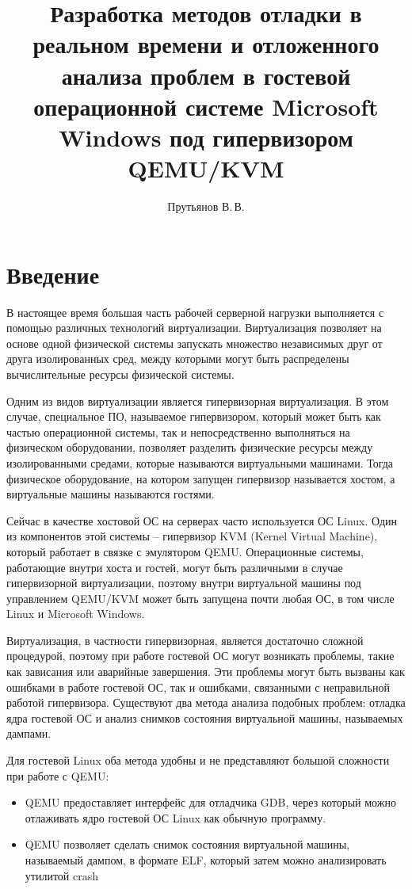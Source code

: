 \documentclass{mipt-thesis-bs}
\title{Разработка методов отладки в реальном времени и отложенного анализа проблем в гостевой операционной системе Microsoft Windows под гипервизором QEMU/KVM}
\author{Прутьянов В.\,В.}
\begin{document}
\titlecontents

\chapter{Введение}

В настоящее время большая часть рабочей серверной нагрузки выполняется с помощью различных технологий виртуализации. Виртуализация позволяет на основе одной физической системы запускать множество независимых друг от друга изолированных сред, между которыми могут быть распределены вычислительные ресурсы физической системы.

Одним из видов виртуализации является гипервизорная виртуализация. В этом случае, специальное ПО, называемое гипервизором, который может быть как частью операционной системы, так и непосредственно выполняться на физическом оборудовании, позволяет разделить физические ресурсы между изолированными средами, которые называются виртуальными машинами. Тогда физическое оборудование, на котором запущен гипервизор называется хостом, а виртуальные машины называются гостями.

Сейчас в качестве хостовой ОС на серверах часто используется ОС Linux. Один из компонентов этой системы -- гипервизор KVM (Kernel Virtual Machine), который работает в связке с эмулятором QEMU. Операционные системы, работающие внутри хоста и гостей, могут быть различными в случае гипервизорной виртуализации, поэтому внутри виртуальной машины под управлением QEMU/KVM может быть запущена почти любая ОС, в том числе Linux и Microsoft Windows.

Виртуализация, в частности гипервизорная, является достаточно сложной процедурой, поэтому при работе гостевой ОС могут возникать проблемы, такие как зависания или аварийные завершения. Эти проблемы могут быть вызваны как ошибками в работе гостевой ОС, так и ошибками, связанными с неправильной работой гипервизора. Существуют два метода анализа подобных проблем: отладка ядра гостевой ОС и анализ снимков состояния виртуальной машины, называемых дампами.

Для гостевой Linux оба метода удобны и не представляют большой сложности при работе с QEMU:

\begin{itemize}
\item QEMU предоставляет интерфейс для отладчика GDB, через который можно отлаживать ядро гостевой ОС Linux как обычную программу.
\item QEMU позволяет сделать снимок состояния виртуальной машины, называемый дампом, в формате ELF, который затем можно анализировать утилитой crash
\end{itemize}
\end{document}

